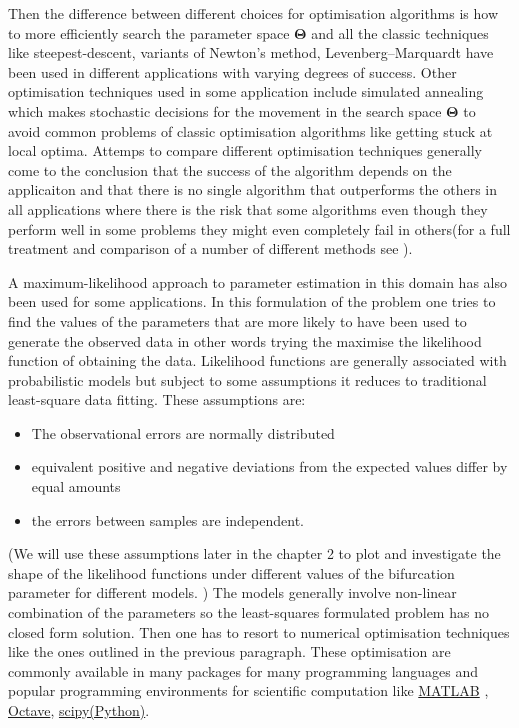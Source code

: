 \documentclass[12pt,a4paper,titlepage]{article}
\begin{document}
Then the difference between different choices for optimisation algorithms is how to more efficiently search the parameter space $\mathbf{\Theta}$ and all the classic techniques like steepest-descent, variants of Newton's method, Levenberg–Marquardt have been used in different applications with varying degrees of success\cite{mendes1998non}. Other optimisation techniques used in some application include simulated annealing\cite{kirkpatrick1983optimization} which makes stochastic decisions for the movement in the search space $\mathbf{\Theta}$ to avoid common problems of classic optimisation algorithms like getting stuck at local optima. Attemps to compare different optimisation techniques generally come to the conclusion that the success of the algorithm depends on the applicaiton and that there is no single algorithm that outperforms the others in all applications where there is the risk that some algorithms even though they perform well in some problems they might even completely fail in others(for a full treatment and comparison of a number of different methods see \cite{mendes1998non}). 

A maximum-likelihood approach to parameter estimation in this domain has also been used for some applications. In this formulation of the problem one tries to find the values of the parameters that are more likely to have been used to generate the observed data in other words trying the maximise the likelihood function of obtaining the data. Likelihood functions are generally associated with probabilistic models but subject to some assumptions it reduces to traditional least-square data fitting. These assumptions are:
\begin{itemize}[noitemsep]
\item{The observational errors are normally distributed}
\item{equivalent positive and negative deviations from the expected values differ by equal amounts}
\item{the errors between samples are independent.}
\end{itemize}
(We will use these assumptions later in the chapter 2 to plot and investigate the shape of the likelihood functions under different values of the bifurcation parameter for different models. ) The models generally involve non-linear combination of the parameters so the least-squares formulated problem has no closed form solution. Then one has to resort to numerical optimisation techniques like the ones outlined in the previous paragraph. These optimisation are commonly available in many packages for many programming languages and popular programming environments for scientific computation like \href{http://www.mathworks.co.uk/products/optimization/}{MATLAB} , \href{http://www.gnu.org/software/octave/doc/interpreter/Optimization.html}{Octave}, \href{http://docs.scipy.org/doc/scipy/reference/tutorial/optimize.html}{scipy(Python)}.
\end{document}
